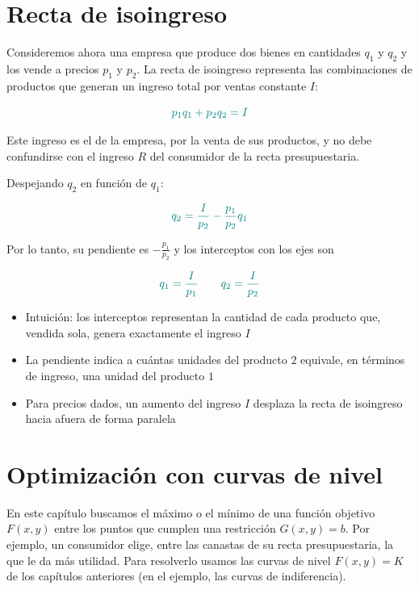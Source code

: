 \documentclass{article}
\begin{document}
\section*{Recta de isoingreso}

Consideremos ahora una empresa que produce dos bienes en cantidades \(q_1\) y \(q_2\) y los vende a precios \(p_1\) y \(p_2\). La {\color{teal}recta de isoingreso} representa las combinaciones de productos que generan un {\color{teal}ingreso total por ventas constante} \(I\):

\[
{\color{teal}
p_1q_1+p_2q_2=I
}
\]

Este ingreso es el de la empresa, por la venta de sus productos, y no debe confundirse con el ingreso \(R\) del consumidor de la recta presupuestaria.

Despejando \(q_2\) en función de \(q_1\):

\[
{\color{teal}
q_2=\frac{I}{p_2}-\frac{p_1}{p_2}q_1
}
\]

Por lo tanto, su pendiente es \(-\frac{p_1}{p_2}\) y los interceptos con los ejes son

\[
{\color{teal}
q_1=\frac{I}{p_1}
\qquad
q_2=\frac{I}{p_2}
}
\]

\begin{itemize}
    \item Intuición: los interceptos representan la cantidad de cada producto que, vendida sola, genera exactamente el ingreso \(I\)

    \item La pendiente indica a cuántas unidades del producto \(2\) equivale, en términos de ingreso, una unidad del producto \(1\)

    \item Para precios dados, un aumento del ingreso \(I\) desplaza la recta de isoingreso hacia afuera de forma paralela
\end{itemize}



\newpage

\section{Optimización con curvas de nivel}



 
En este capítulo buscamos el máximo o el mínimo de una función objetivo \(F(x,y)\) entre los puntos que cumplen una restricción \(G(x,y)=b\). Por ejemplo, un consumidor elige, entre las canastas de su recta presupuestaria, la que le da más utilidad. Para resolverlo usamos las curvas de nivel \(F(x,y)=K\) de los capítulos anteriores (en el ejemplo, las curvas de indiferencia).
 
\end{document}
